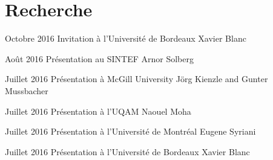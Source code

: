 \section{Recherche}

\begin{yearlist}
      
\item{Octobre 2016}
     {Invitation \`a l'Universit\'e de Bordeaux}
     {Xavier Blanc}
      
\item{Ao\^ut 2016}
     {Pr\'esentation au SINTEF}
     {Arnor Solberg}

\item{Juillet 2016}
     {Pr\'esentation \`a McGill University}
     {J\"org Kienzle and Gunter Mussbacher}

\item{Juillet 2016}
     {Pr\'esentation \`a l'UQAM}
     {Naouel Moha}

\item{Juillet 2016}
     {Pr\'esentation \`a l'Universit\'e de Montr\'eal}
     {Eugene Syriani}
     
\item{Juillet 2016}
     {Pr\'esentation \`a l'Universit\'e de Bordeaux}
     {Xavier Blanc}     

\end{yearlist}